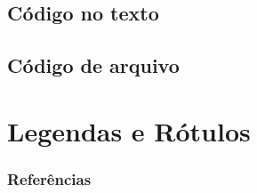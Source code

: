 \documentclass[brazilian]{beamer}
\begin{document}
\subsection{Código no texto}
\subsection{Código de arquivo}

\section{Legendas e Rótulos}

\begin{frame}[allowframebreaks]
    \frametitle{Referências}

    \nocite{*}
    \printbibliography[keyword={inserirCodigos}]

\end{frame}
\end{document}

